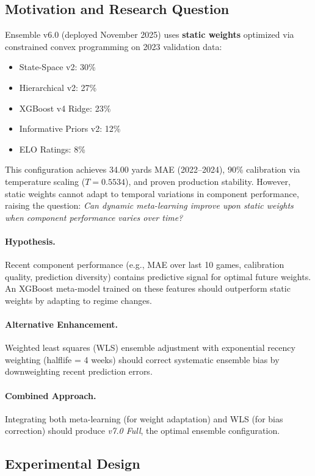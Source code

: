 \subsection{Motivation and Research Question}

Ensemble v6.0 (deployed November 2025) uses \textbf{static weights} optimized via constrained convex programming on 2023 validation data:
\begin{itemize}
  \item State-Space v2: 30\%
  \item Hierarchical v2: 27\%
  \item XGBoost v4 Ridge: 23\%
  \item Informative Priors v2: 12\%
  \item ELO Ratings: 8\%
\end{itemize}

This configuration achieves 34.00 yards MAE (2022--2024), 90\% calibration via temperature scaling ($T=0.5534$), and proven production stability. However, static weights cannot adapt to temporal variations in component performance, raising the question: \textit{Can dynamic meta-learning improve upon static weights when component performance varies over time?}

\paragraph{Hypothesis.}
Recent component performance (e.g., MAE over last 10 games, calibration quality, prediction diversity) contains predictive signal for optimal future weights. An XGBoost meta-model trained on these features should outperform static weights by adapting to regime changes.

\paragraph{Alternative Enhancement.}
Weighted least squares (WLS) ensemble adjustment with exponential recency weighting (halflife = 4 weeks) should correct systematic ensemble bias by downweighting recent prediction errors.

\paragraph{Combined Approach.}
Integrating both meta-learning (for weight adaptation) and WLS (for bias correction) should produce \textit{v7.0 Full}, the optimal ensemble configuration.

\subsection{Experimental Design}

